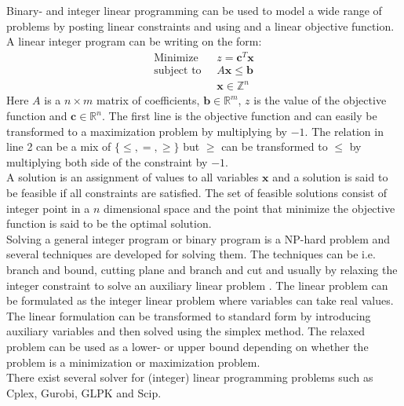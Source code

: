 Binary- and integer linear programming can be used to model a wide range of problems by posting linear constraints and 
using and a linear objective function. A linear integer program can be writing on the form: 
\begin{align}
 \text{Minimize }\; &z =  \mathbf{c}^T\mathbf{x} \\ 
 \text{subject to } \; & A\mathbf{x} \leq \mathbf{b} \\ 
 & \mathbf{x} \in \mathbb{Z}^n
\end{align}
Here $A$ is a $n \times m$ matrix of coefficients, $\mathbf{b} \in \mathbb{R}^m$, $z$ is the value of the objective 
function and $\mathbf{c} \in \mathbb{R}^n$. The first line is the objective function and can easily be transformed to a 
maximization problem by multiplying by $-1$. The relation in line 2 can be a mix of $\{\leq,=,\geq\}$ but $\geq$ can 
be transformed to $\leq$ by multiplying both side of the constraint by $-1$.  \\ 
A solution is an assignment of values to all variables $\mathbf{x}$ and a solution is said to be feasible if all 
constraints are satisfied. The set of feasible solutions consist of integer point in a $n$ dimensional space and the 
point that minimize the objective function is said to be the optimal solution. \\
Solving a general integer program or binary program is a NP-hard problem and several techniques are developed for 
solving them. The techniques can be i.e. branch and bound, cutting plane and branch and cut and usually by
relaxing the integer constraint to solve an auxiliary linear problem \cite[p. 30]{ilp}. The linear problem can be 
formulated as the integer linear problem where variables can take real values. The linear formulation can be 
transformed to standard form by introducing auxiliary variables and then solved using the simplex method. The relaxed 
problem can be used as a lower- or upper bound depending on whether the problem is a minimization or maximization 
problem.  \\ 
There exist several solver for (integer) linear programming problems such as Cplex, Gurobi, GLPK and Scip. 